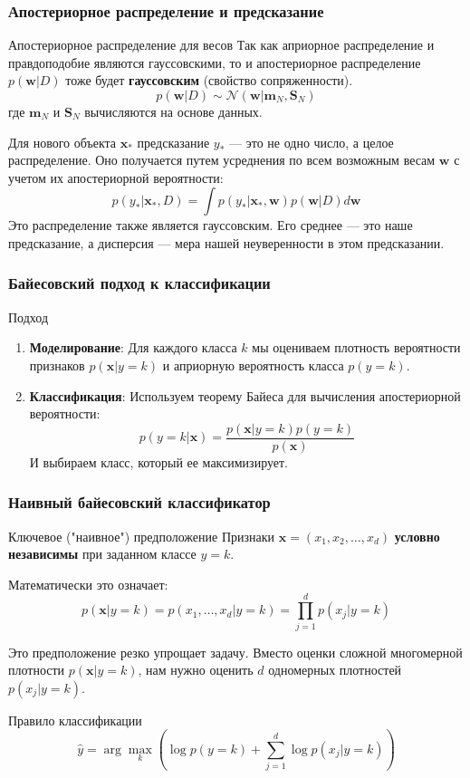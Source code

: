 \documentclass[notheorems, handout]{beamer}
\newcommand{\vect}[1]{\mathbf{#1}}
\newcommand{\matr}[1]{\boldsymbol{#1}}
\begin{document}
\begin{frame}
  \frametitle{Апостериорное распределение и предсказание}
  \begin{block}{Апостериорное распределение для весов}
    Так как априорное распределение и правдоподобие являются гауссовскими, то и апостериорное распределение $p(\vect{w}|D)$ тоже будет \textbf{гауссовским} (свойство сопряженности).
    $$ p(\vect{w}|D) \sim \mathcal{N}(\vect{w} | \vect{m}_N, \matr{S}_N) $$
    где $\vect{m}_N$ и $\matr{S}_N$ вычисляются на основе данных.
  \end{block}
  
    Для нового объекта $\vect{x}_*$ предсказание $y_*$ --- это не одно число, а целое распределение. Оно получается путем усреднения по всем возможным весам $\vect{w}$ с учетом их апостериорной вероятности:
    \[ p(y_*|\vect{x}_*, D) = \int p(y_*|\vect{x}_*, \vect{w}) p(\vect{w}|D) d\vect{w} \]
    Это распределение также является гауссовским. Его среднее --- это наше предсказание, а дисперсия --- мера нашей неуверенности в этом предсказании.
\end{frame}

\begin{frame}
  \frametitle{Байесовский подход к классификации} 
  \begin{block}{Подход}
    \begin{enumerate}
      \item \textbf{Моделирование}: Для каждого класса $k$ мы оцениваем плотность вероятности признаков $p(\vect{x}|y=k)$ и априорную вероятность класса $p(y=k)$.
      \item \textbf{Классификация}: Используем теорему Байеса для вычисления апостериорной вероятности:
      $$ p(y=k|\vect{x}) = \frac{p(\vect{x}|y=k) p(y=k)}{p(\vect{x})} $$
      И выбираем класс, который ее максимизирует.
    \end{enumerate}
  \end{block}
\end{frame}
\begin{frame}
  \frametitle{Наивный байесовский классификатор}
  \begin{block}{Ключевое ("наивное") предположение}
  Признаки $\vect{x} = (x_1, x_2, \dots, x_d)$ \textbf{условно независимы} при заданном классе $y=k$.
  \end{block}
  Математически это означает:
  $$ p(\vect{x}|y=k) = p(x_1, \dots, x_d|y=k) = \prod_{j=1}^{d} p(x_j|y=k) $$
  
  Это предположение резко упрощает задачу. Вместо оценки сложной многомерной плотности $p(\vect{x}|y=k)$, нам нужно оценить $d$ одномерных плотностей $p(x_j|y=k)$.
  
  \begin{block}{Правило классификации}
  $$ \hat{y} = \arg\max_k \left( \log p(y=k) + \sum_{j=1}^{d} \log p(x_j|y=k) \right) $$
  \end{block}
\end{frame}
\end{document}

